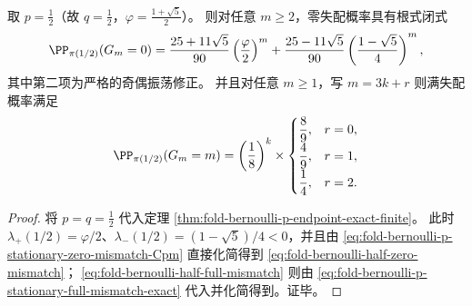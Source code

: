\begin{corollary}[对称基线的根式闭式与相位振荡]\label{cor:fold-bernoulli-half-endpoints-oscillation}
取 \(p=\tfrac12\)（故 \(q=\tfrac12\)，\(\varphi=\frac{1+\sqrt5}{2}\)）。
则对任意 \(m\ge 2\)，零失配概率具有根式闭式
\begin{equation}\label{eq:fold-bernoulli-half-zero-mismatch}
\PP_{\pi(1/2)}(G_m=0)=\frac{25+11\sqrt5}{90}\left(\frac{\varphi}{2}\right)^m
+\frac{25-11\sqrt5}{90}\left(\frac{1-\sqrt5}{4}\right)^m,
\end{equation}
其中第二项为严格的奇偶振荡修正。
并且对任意 \(m\ge 1\)，写 \(m=3k+r\) 则满失配概率满足
\begin{equation}\label{eq:fold-bernoulli-half-full-mismatch}
\PP_{\pi(1/2)}(G_m=m)=\left(\frac18\right)^k\times
\begin{cases}
\dfrac{8}{9}, & r=0,\\[0.8ex]
\dfrac{4}{9}, & r=1,\\[0.8ex]
\dfrac{1}{4}, & r=2.
\end{cases}
\end{equation}
\end{corollary}
\begin{proof}
将 \(p=q=\tfrac12\) 代入定理 \ref{thm:fold-bernoulli-p-endpoint-exact-finite}。
此时 \(\lambda_+(1/2)=\varphi/2\)、\(\lambda_-(1/2)=(1-\sqrt5)/4<0\)，并且由
\eqref{eq:fold-bernoulli-p-stationary-zero-mismatch-Cpm} 直接化简得到 \eqref{eq:fold-bernoulli-half-zero-mismatch}；
\eqref{eq:fold-bernoulli-half-full-mismatch} 则由 \eqref{eq:fold-bernoulli-p-stationary-full-mismatch-exact} 代入并化简得到。证毕。
\end{proof}

